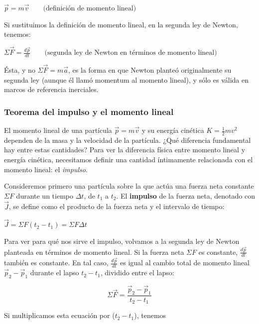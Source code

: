 \documentclass{article}
\newcommand{\newtitle}[1]{
    \color{titleColor}
    \subsubsection{\textbf{#1}}
    \color{black}
}
\newcommand{\bl}[1]{\textbf{#1}}
\newcommand{\definicion}[1]{%
    \vspace{0.5cm}
    \begin{definicionbox}
        #1
    \end{definicionbox}
    \vspace{0.5cm}
}
\begin{document}
    \definicion{
        \centering
        \( \vec{p} = m \vec{v} \quad \quad \text{(deﬁnición de momento lineal)} \)
    }

    \par Si sustituimos  la deﬁnición de momento lineal, en la segunda ley de Newton, tenemos:

    \definicion{
        \centering
        \( \Sigma \vec{F} = \frac{d \vec{p}}{dt} \quad \quad \text{(segunda ley de Newton en términos de momento lineal)} \)
    }

    \par Ésta, y no $\Sigma \vec{F} = m \vec{a}$, es la forma en que Newton planteó originalmente su segunda ley (aunque él llamó momentum al momento lineal), y sólo es válida en marcos de referencia inerciales.

    \newtitle{Teorema del impulso y el momento lineal}

    \par El momento lineal de una partícula $\vec{p} = m \vec{v}$ y su energía cinética $K = \frac{1}{2}mv^2$ dependen de la masa y la velocidad de la partícula. ¿Qué diferencia fundamental hay entre estas cantidades? Para ver la diferencia física entre momento lineal y energía cinética, necesitamos deﬁnir una cantidad íntimamente relacionada con el momento lineal: el \textit{impulso}.

    \par Consideremos primero una partícula sobre la que actúa una fuerza neta constante $\Sigma F$ durante un tiempo $\Delta t$, de $t_1$ a $t_2$. El \bl{impulso} de la fuerza neta, denotado con $\vec{J}$, se deﬁne como el producto de la fuerza neta y el intervalo de tiempo:

    \definicion{
        \centering
        \( \vec{J} = \Sigma F (t_2 - t_1) = \Sigma F \Delta t \)
    }

    \par Para ver para qué nos sirve el impulso, volvamos a la segunda ley de Newton planteada en términos de momento lineal. Si la fuerza neta $\Sigma F$ es constante, $\frac{d \vec{p}}{dt}$ también es constante. En tal caso, $\frac{d \vec{p}}{dt}$ es igual al cambio total de momento lineal $\vec{p}_2 - \vec{p}_1$ durante el lapso $t_2 - t_1$, dividido entre el lapso:

    \[ \Sigma \vec{F} = \frac{\vec{p}_2 - \vec{p}_1}{t_2 - t_1} \]

    \par Si multiplicamos esta ecuación por ($t_2 - t_1$), tenemos
\end{document}

